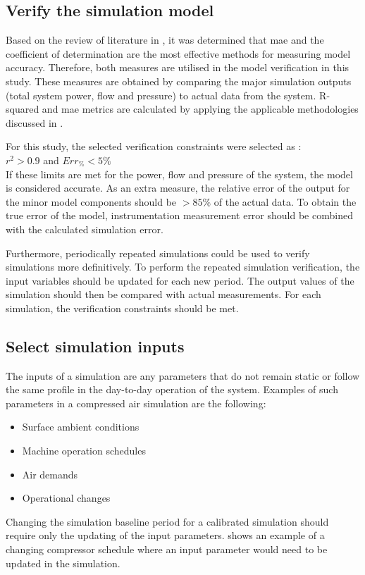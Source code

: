 	\subsection{Verify the simulation model}
	Based on the review of literature in , it was determined that \gls{mae} and the coefficient of determination are the most effective methods for measuring model accuracy. Therefore, both measures are utilised in the model verification in this study. These measures are obtained by comparing the major simulation outputs (total system power, flow and pressure) to actual data from the system. R-squared and \gls{mae} metrics are calculated by applying the applicable methodologies discussed in .	
	\par 
	For this study, the selected verification constraints were selected as : \\ {$r^2 > 0.9 $ and $ Err_{\%} < 5\% $}\\ 
	If these limits are met for the power, flow and pressure of the system, the model is considered accurate. As an extra measure, the relative error of the output for the minor model components should be $ > 85\%$ of the actual data. To obtain the true error of the model, instrumentation measurement error should be combined with the calculated simulation error.
	\par 
	\clearpage
	Furthermore, periodically repeated simulations could be used to verify simulations more definitively. To perform the repeated simulation verification, the input variables should be updated for each new period. The output values of the simulation should then be compared with actual measurements. For each simulation, the verification constraints should be met.
		
	\subsection{Select simulation inputs}
		The inputs of a simulation are any parameters that do not remain static or follow the same profile in the day-to-day operation of the system. Examples of such parameters in a compressed air simulation are the following:
		\begin{itemize}
			\item Surface ambient conditions
			\item Machine operation schedules
			\item Air demands
			\item Operational changes
		\end{itemize} 
	Changing the simulation baseline period for a calibrated simulation should require only the updating of the input parameters.  shows an example of a changing compressor schedule where an input parameter would need to be updated in the simulation.	

